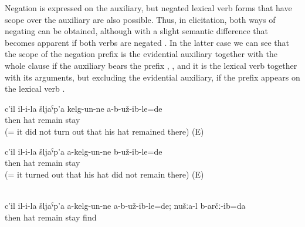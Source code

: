 Negation is expressed on the auxiliary, but negated lexical verb forms that have scope over the auxiliary are also possible. Thus, in elicitation, both ways of negating can be obtained, although with a slight semantic difference that becomes apparent if both verbs are negated . In the latter case we can see that the scope of the negation prefix is the evidential auxiliary together with the whole clause if the auxiliary bears the prefix , , and it is the lexical verb together with its arguments, but excluding the evidential auxiliary, if the prefix appears on the lexical verb .
%
\begin{exe}
		\ex	\label{ex:Then (apparently) his hat did not remain there@14a}
		\gll	c'il	il-i-la	šljaˁp'a	kelg-un-ne	a-b-už-ib-le=de\\
			then		hat	remain	stay\\
		\glt	{} (= it did not turn out that his hat remained there) (E)

		\ex	\label{ex:Then (apparently) his hat did not remain there@14b}
		\gll	c'il	il-i-la	šljaˁp'a	a-kelg-un-ne	b-už-ib-le=de\\
			then		hat	remain	stay\\
		\glt	{} (= it turned out that his hat did not remain there) (E)

		\\\label{ex:Then it did not turn out that his hat did not remain there, but (by contrast) we found it (there)@14c}%
		\gll	c'il	il-i-la	šljaˁp'a	a-kelg-un-ne	a-b-už-ib-le=de; nušːa-l	b-arčː-ib=da\\
			then		hat	remain	stay		find\\
		\glt	{}
\end{exe}

